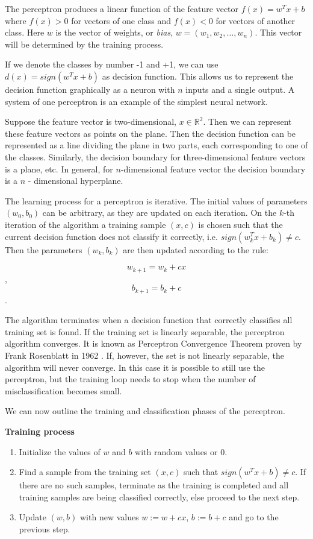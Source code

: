 \documentclass[12pt]{report}
\newcommand{\re}{\mathbb{R}}
\begin{document}
The perceptron produces a linear function of the feature vector $f(x) = w^Tx + b$ where $f(x) > 0$ for vectors of one class and $f(x) < 0$ for vectors of another class. Here $w$ is the vector of weights, or \textit{bias}, $w = (w_1, w_2, \dots, w_n)$. This vector will be determined by the training process.

If we denote the classes by number -1 and +1, we can use $d(x) = sign(w^Tx + b)$ as decision function. This allows us to represent the decision function graphically as a neuron with $n$ inputs and a single output. A system of one perceptron is an example of the simplest neural network.

Suppose the feature vector is two-dimensional, $x \in \re^2$. Then we can represent these feature vectors as points on the plane. Then the decision function can be represented as a line dividing the plane in two parts, each corresponding to one of the classes. Similarly, the decision boundary for three-dimensional feature vectors is a plane, etc. In general, for $n$-dimensional feature vector the decision boundary is a $n$ - dimensional hyperplane.

The learning process for a perceptron is iterative. The initial values of parameters $(w_0, b_0)$ can be arbitrary, as they are updated on each iteration. On the $k$-th iteration of the algorithm a training sample $(x, c)$ is chosen such that the current decision function does not classify it correctly, i.e. $sign(w_k^Tx + b_k) \ne c$. Then the parameters $(w_k, b_k)$ are then updated according to the rule:

$$w_{k+1} = w_k + cx$$,
$$b_{k+1} = b_k + c$$.

The algorithm terminates when a decision function that correctly classifies
all training set is found. If the training set is linearly separable, the perceptron algorithm converges. It is known as Perceptron Convergence Theorem proven by Frank Rosenblatt in 1962 \cite{Cristianini}. If, however, the set is not linearly separable, the algorithm will never converge. In this case it is possible to still use the perceptron, but the training loop needs to stop when the number of misclassification becomes small.

We can now outline the training and classification phases of the perceptron.

\textbf{Training process}

\begin{enumerate}
	\item Initialize the values of $w$ and $b$ with random values or 0.
	\item Find a sample from the training set $(x, c)$ such that $sign(w^Tx + b) \ne c$. If there are no such samples, terminate as the training is completed and all training samples are being classified correctly, else proceed to the next step.
	\item Update $(w, b)$ with new values $w := w + cx$, $b := b + c$ and go to the previous step.
\end{enumerate}
\end{document}
